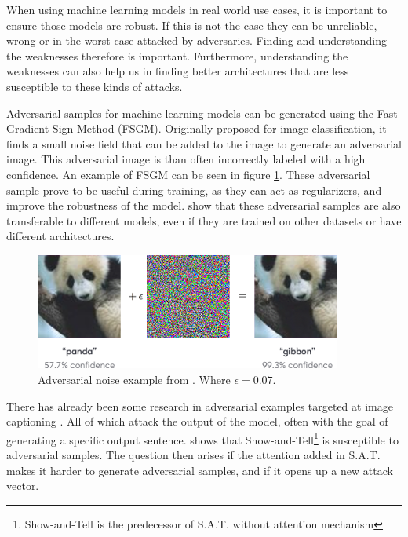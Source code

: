 When using machine learning models in real world use cases, it is important to ensure those models are robust. If this is not the case they can be unreliable, wrong or in the worst case attacked by adversaries. Finding and understanding the weaknesses therefore is important. Furthermore, understanding the weaknesses can also help us in finding better architectures that are less susceptible to these kinds of attacks.

Adversarial samples for machine learning models can be generated using the Fast Gradient Sign Method (FSGM)\cite{goodfellow2015explaining}. Originally proposed for image classification, it finds a small noise field that can be added to the image to generate an adversarial image. This adversarial image is than often incorrectly labeled with a high confidence. An example of FSGM can be seen in figure \ref{adv_gibbon}. These adversarial sample prove to be useful during training, as they can act as regularizers, and improve the robustness of the model. \citeauthor{https://doi.org/10.48550/arxiv.1611.01236} show that these adversarial samples are also transferable to different models, even if they are trained on other datasets or have different architectures.

\begin{figure}[h]
    \centering
    \includegraphics[width=0.9\textwidth]{figures/adversarial_img_1.png}
    \caption{Adversarial noise example from \protect\cite{goodfellow2015explaining}. Where $\epsilon=0.07$.}
    \label{adv_gibbon}
\end{figure}

There has already been some research in adversarial examples targeted at image captioning \cite{https://doi.org/10.48550/arxiv.2107.03050,Hongge}. All of which attack the output of the model, often with the goal of generating a specific output sentence. \citeauthor{Hongge} shows that Show-and-Tell\footnote[1]{Show-and-Tell is the predecessor of S.A.T. without attention mechanism}\cite{showandtell} is susceptible to adversarial samples. The question then arises if the attention added in S.A.T. makes it harder to generate adversarial samples, and if it opens up a new attack vector.

